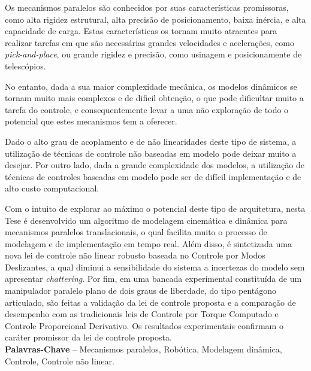 \documentclass[]{politex}
\begin{document}
\begin{resumo}
Os mecanismos paralelos são conhecidos por suas características promissoras, como alta rigidez estrutural,  alta precisão de posicionamento, baixa inércia, e alta capacidade de carga. Estas características os tornam muito atraentes para realizar tarefas em que são necessárias grandes velocidades e acelerações, como {\em pick-and-place}, ou grande rigidez e precisão, como usinagem e posicionamente de telescópios.

No entanto, dada a sua maior complexidade mecânica, os modelos dinâmicos se tornam muito mais complexos e de dificil obtenção, o que pode dificultar muito a tarefa do controle, e consequentemente levar a uma não exploração de todo o potencial que estes mecanismos tem a oferecer.

Dado o alto grau de acoplamento e de não linearidades deste tipo de sistema, a utilização de técnicas de controle não baseadas em modelo pode deixar muito a desejar. Por outro lado, dada a grande complexidade dos modelos, a utilização de técnicas de controles baseadas em modelo pode ser de difícil implementação e de alto custo computacional.

Com o intuito de explorar ao máximo o potencial deste tipo de arquitetura, nesta Tese é desenvolvido um algoritmo de modelagem cinemática e dinâmica para mecanismos paralelos translacionais, o qual facilita muito o processo de modelagem e de implementação em tempo real. Além disso, é sintetizada uma nova lei de controle não linear robusto baseada no Controle por Modos Deslizantes, a qual diminui a sensibilidade do sistema a incertezas do modelo sem apresentar \emph{chattering}. Por fim, em uma bancada experimental constituída de um manipulador paralelo plano de dois graus de liberdade, do tipo pentágono articulado, são feitas a validação da lei de controle proposta e a comparação de desempenho com as tradicionais leis de Controle por Torque Computado e Controle Proporcional Derivativo. Os resultados experimentais confirmam o caráter promissor da lei de controle proposta.
%
\\[3\baselineskip]
%


\textbf{Palavras-Chave} -- Mecanismos paralelos, Robótica, Modelagem dinâmica, Controle, Controle não linear.
\end{resumo}
\end{document}
